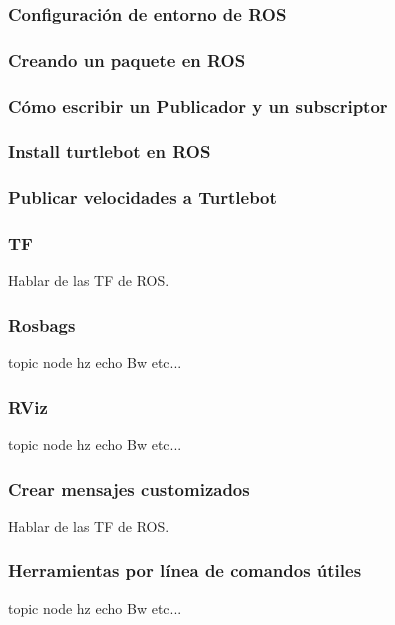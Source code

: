 \begin{frame}
	\frametitle{Configuración de entorno de ROS}
	
	
\end{frame}

\begin{frame}
	\frametitle{Creando un paquete en ROS}
	
	
\end{frame}

\begin{frame}
	\frametitle{Cómo escribir un Publicador y un subscriptor}

\end{frame}


\begin{frame}
	\frametitle{Install turtlebot en ROS}
	
\end{frame}

\begin{frame}
	\frametitle{Publicar velocidades a Turtlebot}
	
\end{frame}

\begin{frame}
	\frametitle{TF}
	Hablar de las TF de ROS.
	
\end{frame}

\begin{frame}
	\frametitle{Rosbags}
	topic node hz echo Bw etc...
	
\end{frame}

\begin{frame}
	\frametitle{RViz}
	topic node hz echo Bw etc...
	
\end{frame}

\begin{frame}
	\frametitle{Crear mensajes customizados}
	Hablar de las TF de ROS.
	
\end{frame}

\begin{frame}
	\frametitle{Herramientas por línea de comandos útiles}
    topic node hz echo Bw etc...
	
\end{frame}
